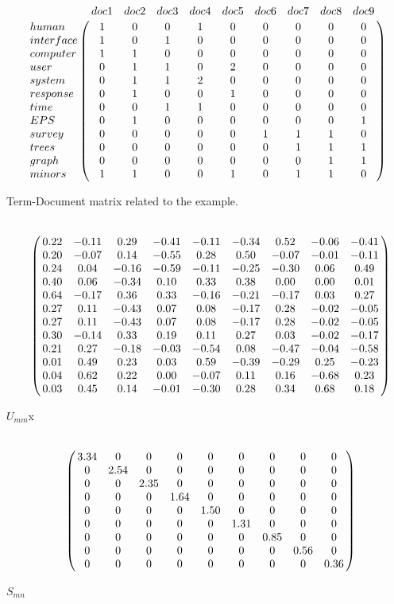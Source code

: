 \begin{table}[h!]
	\begin{equation} \nonumber
	\bordermatrix{~ & doc1 & doc2 & doc3 & doc4 & doc5 & doc6 & doc7 & doc8 & doc9 \cr	
		human	& 1 & 0 & 0 & 1 & 0 & 0 & 0 & 0 & 0 \cr
		interface	& 1 & 0 & 1 & 0 & 0 & 0 & 0 & 0 & 0 \cr
		computer	& 1 & 1 & 0 & 0 & 0 & 0 & 0 & 0 & 0 \cr    
		user 		& 0 & 1 & 1 & 0 & 2 & 0 & 0 & 0 & 0 \cr
		system 	& 0 & 1 & 1 & 2 & 0 & 0 & 0 & 0 & 0 \cr
		response	& 0 & 1 & 0 & 0 & 1 & 0 & 0 & 0 & 0 \cr
		time 		& 0 & 0 & 1 & 1 & 0 & 0 & 0 & 0 & 0 \cr
		EPS 		& 0 & 1 & 0 & 0 & 0 & 0 & 0 & 0 & 1 \cr
		survey	& 0 & 0 & 0 & 0 & 0 & 1 & 1 & 1 & 0 \cr
		trees 		& 0 & 0 & 0 & 0 & 0 & 0 & 1 & 1 & 1 \cr
		graph 		& 0 & 0 & 0 & 0 & 0 & 0 & 0 & 1 & 1 \cr
		minors		& 1 & 1 & 0 & 0 & 1 & 0 & 1 & 1 & 0 \cr	  }
	\end{equation}
	\caption{Term-Document matrix related to the example.}
	\label{fig:TDM}
\end{table}

\begin{table}[h!]
	\begin{equation} \nonumber
	\bordermatrix{ ~ \cr
		& 0.22 & -0.11 & 0.29 & -0.41 & -0.11 & -0.34 & 0.52 & -0.06 & -0.41 \cr
		& 0.20 & -0.07 & 0.14 & -0.55 & 0.28 & 0.50 & -0.07 & -0.01 & -0.11 \cr
		& 0.24 & 0.04 & -0.16 & -0.59 & -0.11 & -0.25 & -0.30 & 0.06 & 0.49 \cr
		& 0.40 & 0.06 & -0.34 & 0.10 & 0.33 & 0.38 & 0.00 & 0.00 & 0.01 \cr
		& 0.64 & -0.17 & 0.36 & 0.33 & -0.16 & -0.21 & -0.17 & 0.03 & 0.27 \cr
		& 0.27 & 0.11 & -0.43 & 0.07 & 0.08 & -0.17 & 0.28 & -0.02 & -0.05 \cr
		& 0.27 & 0.11 & -0.43 & 0.07 & 0.08 & -0.17 & 0.28 & -0.02 & -0.05 \cr
		& 0.30 & -0.14 & 0.33 & 0.19 & 0.11 & 0.27 & 0.03 & -0.02 & -0.17 \cr
		& 0.21 & 0.27 & -0.18 & -0.03 & -0.54 & 0.08 & -0.47 & -0.04 & -0.58 \cr
		& 0.01 & 0.49 & 0.23 & 0.03 & 0.59 & -0.39 & -0.29 & 0.25 & -0.23 \cr
		& 0.04 & 0.62 & 0.22 & 0.00 & -0.07 & 0.11 & 0.16 & -0.68 & 0.23 \cr
		& 0.03 & 0.45 & 0.14 & -0.01 & -0.30 & 0.28 & 0.34 & 0.68 & 0.18 \cr	  }
	\end{equation}
	\caption{$U_{mm}$x}
	\label{fig:TDM}
\end{table}

\begin{table}[h!]
	\begin{equation} \nonumber
	\bordermatrix{~  \cr	
		& 3.34 & 0 & 0 & 0 & 0 & 0 & 0 & 0 & 0 \cr
		& 0 & 2.54 & 0 & 0 & 0 & 0 & 0 & 0 & 0 \cr
		& 0 & 0 & 2.35 & 0 & 0 & 0 & 0 & 0 & 0 \cr
		& 0 & 0 & 0 & 1.64 & 0 & 0 & 0 & 0 & 0 \cr
		& 0 & 0 & 0 & 0 & 1.50 & 0 & 0 & 0 & 0 \cr
		& 0 & 0 & 0 & 0 & 0 & 1.31 & 0 & 0 & 0 \cr
		& 0 & 0 & 0 & 0 & 0 & 0 & 0.85 & 0 & 0 \cr
		& 0 & 0 & 0 & 0 & 0 & 0 & 0 & 0.56 & 0 \cr
		& 0 & 0 & 0 & 0 & 0 & 0 & 0 & 0 & 0.36 \cr
	  }
	\end{equation}
	\caption{ $S_{mn}$}
	\label{fig:TDM}
\end{table}

